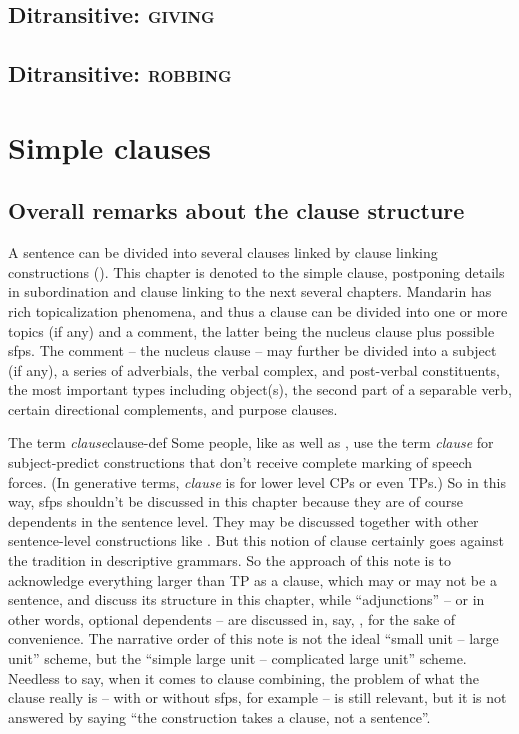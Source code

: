 \documentclass[UTF8, a4paper, oneside, scheme=plain]{ctexrep}
\newcommand*{\citepage}[1]{p.~{#1}}
\newcommand*{\term}[1]{\emph{#1}}
\newcommand*{\category}[1]{\textsc{#1}}
\begin{document}
\section{Ditransitive: \category{giving}}



\section{Ditransitive: \category{robbing}}

\chapter{Simple clauses}

\section{Overall remarks about the clause structure}

A sentence can be divided into several clauses linked by clause linking constructions 
().
This chapter is denoted to the simple clause,
postponing details in subordination and clause linking to the next several chapters.
Mandarin has rich topicalization phenomena,
and thus a clause can be divided into
one or more topics (if any) and a comment,
the latter being the nucleus clause
plus possible \acl{sfp}s.
The comment -- the nucleus clause -- may further be divided into a subject (if any),
a series of adverbials, 
the verbal complex, and post-verbal constituents,
the most important types including object(s), 
the second part of a separable verb,
certain directional complements,
and purpose clauses.

\begin{infobox}{The term \term{clause}}{clause-def}
    Some people, like \citet[\citepage{140}]{deng2010formal}
    as well as \citet{dixon2009basic},
    use the term \term{clause} for subject-predict constructions 
    that don't receive complete marking of speech forces.
    (In generative terms, \term{clause} is for lower level CPs or even TPs.)
    So in this way, \acl{sfp}s shouldn't be discussed in this chapter because 
    they are of course dependents in the sentence level.
    They may be discussed together with other sentence-level constructions like .
    But this notion of clause certainly goes against the tradition in descriptive grammars.
    So the approach of this note is to acknowledge everything larger than TP as a clause,
    which may or may not be a sentence,
    and discuss its structure in this chapter,
    while ``adjunctions'' -- or in other words, optional dependents -- 
    are discussed in, say, ,
    for the sake of convenience.
    The narrative order of this note is not the ideal ``small unit -- large unit'' scheme,
    but the ``simple large unit -- complicated large unit'' scheme.
    Needless to say,
    when it comes to clause combining, 
    the problem of what the clause really is -- with or without \ac{sfp}s, for example --
    is still relevant,
    but it is not answered by saying ``the construction takes a clause, not a sentence''.
\end{infobox}
\end{document}
